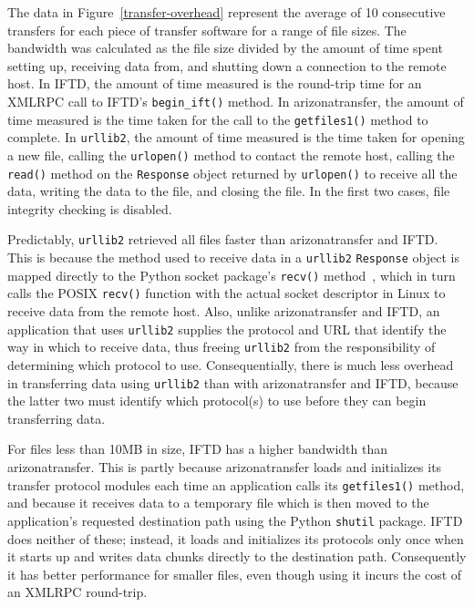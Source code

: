 The data in Figure~\ref{transfer-overhead} represent the average of 10 consecutive transfers for each piece of transfer software for a range of file sizes.  The bandwidth was calculated as the file size divided by the amount of time spent setting up, receiving data from, and shutting down a connection to the remote host.  In IFTD, the amount of time measured is the round-trip time for an XMLRPC call to IFTD's \texttt{begin\_ift()} method.  In arizonatransfer, the amount of time measured is the time taken for the call to the \texttt{getfiles1()} method to complete.  In \texttt{urllib2}, the amount of time measured is the time taken for opening a new file, calling the \texttt{urlopen()} method to contact the remote host, calling the \texttt{read()} method on the \texttt{Response} object returned by \texttt{urlopen()} to receive all the data, writing the data to the file, and closing the file.  In the first two cases, file integrity checking is disabled.

Predictably, \texttt{urllib2} retrieved all files faster than arizonatransfer and IFTD.  This is because the method used to receive data in a \texttt{urllib2} \texttt{Response} object is mapped directly to the Python socket package's \texttt{recv()} method~\cite{urllib2_code}, which in turn calls the POSIX \texttt{recv()} function with the actual socket descriptor in Linux to receive data from the remote host.  Also, unlike arizonatransfer and IFTD, an application that uses \texttt{urllib2} supplies the protocol and URL that identify the way in which to receive data, thus freeing \texttt{urllib2} from the responsibility of determining which protocol to use.  Consequentially, there is much less overhead in transferring data using \texttt{urllib2} than with arizonatransfer and IFTD, because the latter two must identify which protocol(s) to use before they can begin transferring data.

For files less than 10MB in size, IFTD has a higher bandwidth than arizonatransfer.  This is partly because arizonatransfer loads and initializes its transfer protocol modules each time an application calls its \texttt{getfiles1()} method, and because it receives data to a temporary file which is then moved to the application's requested destination path using the Python \texttt{shutil} package.  IFTD does neither of these; instead, it loads and initializes its protocols only once when it starts up and writes data chunks directly to the destination path.  Consequently it has better performance for smaller files, even though using it incurs the cost of an XMLRPC round-trip.

